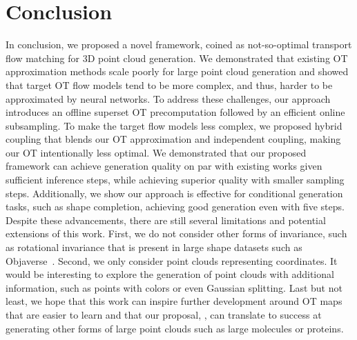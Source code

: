 \vspace{-4mm}
\section{Conclusion}
\vspace{-4mm}
In conclusion, we proposed a novel framework, coined as not-so-optimal transport flow matching for 3D point cloud generation. We demonstrated that existing OT approximation methods scale poorly for large point cloud generation and showed that target OT flow models tend to be more complex, and thus, harder to be approximated by neural networks. To address these challenges, our approach introduces an offline superset OT precomputation followed by an efficient online subsampling. To make the target flow models less complex, we proposed hybrid coupling that blends our OT approximation and independent coupling, making our OT intentionally less optimal. We demonstrated that our proposed framework can achieve generation quality on par with existing works given sufficient inference steps, while achieving superior quality with smaller sampling steps.
%
Additionally, we show our approach is effective for conditional generation tasks, such as shape completion, achieving good generation even with five steps. 
%
Despite these advancements, there are still several limitations and potential extensions of this work. First, we do not consider other forms of invariance, such as rotational invariance that is present in large shape datasets such as Objaverse~\cite{deitke2023objaverse}. 
%
Second, we only consider point clouds representing coordinates. It would be interesting to explore the generation of point clouds with additional information, such as points with colors or even Gaussian splitting. 
%
%
Last but not least, we hope that this work can inspire further development around OT maps that are easier to learn and that our proposal, , can translate to success at generating other forms of large point clouds such as large molecules or proteins.



